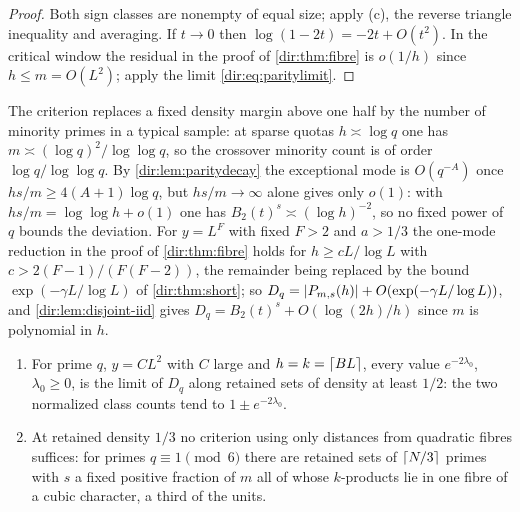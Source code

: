 \begin{proof}
Both sign classes are nonempty of equal size; apply (c), the reverse triangle inequality and averaging.
If $t\to0$ then $\log(1-2t)=-2t+O(t^2)$. In the critical window the residual in the proof of
\cref{dir:thm:fibre} is $o(1/h)$ since $h\le m=O(L^2)$; apply the limit \eqref{dir:eq:paritylimit}.
\end{proof}

The criterion replaces a fixed density margin above one half by the number of minority primes in a
typical sample: at sparse quotas $h\asymp\log q$ one has $m\asymp(\log q)^2/\log\log q$, so the crossover
minority count is of order $\log q/\log\log q$. By \cref{dir:lem:paritydecay} the exceptional mode is
$O(q^{-A})$ once $hs/m\ge4(A+1)\log q$, but $hs/m\to\infty$ alone gives only $o(1)$: with
$hs/m=\log\log h+o(1)$ one has $B_2(t)^s\asymp(\log h)^{-2}$, so no fixed power of $q$ bounds the
deviation. For $y=L^F$ with fixed $F>2$ and $a>1/3$ the one-mode reduction in the proof of
\cref{dir:thm:fibre} holds for $h\ge cL/\log L$ with $c>2(F-1)/(F(F-2))$, the remainder being replaced
by the bound $\exp(-\gamma L/\log L)$ of \cref{dir:thm:short}; so $D_q=\lvert P_{m,s}(h)\rvert+O(\exp(-\gamma L/\log L))$,
and \cref{dir:lem:disjoint-iid} gives $D_q=B_2(t)^s+O(\log(2h)/h)$ since $m$ is polynomial in $h$.

\begin{proposition}\label{dir:prop:fibresharp}
\begin{enumerate}[label=\textup{(\alph*)}]
\item For prime $q$, $y=CL^2$ with $C$ large and $h=k=\lceil BL\rceil$, every value $e^{-2\lambda_0}$,
$\lambda_0\ge0$, is the limit of $D_q$ along retained sets of density at least $1/2$: the two normalized
class counts tend to $1\pm e^{-2\lambda_0}$.
\item At retained density $1/3$ no criterion using only distances from quadratic fibres suffices: for
primes $q\equiv1\pmod6$ there are retained sets of $\lceil N/3\rceil$ primes with $s$ a fixed positive fraction
of $m$ all of whose $k$-products lie in one fibre of a cubic character, a third of the units.
\end{enumerate}
\end{proposition}

